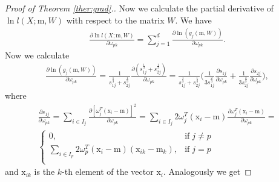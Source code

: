 \documentclass[12pt]{article}
\def\w{\omega}
\def\v{\mathrm{V}}
\def\x{\mathrm{x}}
\def\m{\mathrm{m}}
\theoremstyle{definition}
\begin{document}
\begin{proof}[Proof of Theorem \ref{ther:grad}.]
Now we calculate the partial derivative of $\ln {l}(X;\m,W)$ with respect to the matrix $W$. We have
$$
\begin{array}{l}
\frac{\partial \ln {l}(X;\m,W)}{\partial \w_{pk}} = \sum\limits_{j=1}^d \frac{\partial \ln ({g}_j(\m,W))}{\partial \w_{pk}}.
\end{array}
$$
Now we calculate %
$$
\begin{array}{l}
\frac{\partial \ln ({g}_j(\m,W))}{\partial \w_{pk}} = \frac{1}{{s}_{1j}^{\frac{1}{3}} + {s}_{2j}^{\frac{1}{3}}} \frac{\partial ({s}_{1j}^{\frac{1}{3}} + {s}_{2j}^{\frac{1}{3}})}{\partial \w_{pk}}= \frac{1}{{s}_{1j}^{\frac{1}{3}} + {s}_{2j}^{\frac{1}{3}}} \bigg(
\frac{1}{3 {s}_{1j}^{\frac{2}{3}}}  \frac{\partial {s}_{1j}}{\partial \w_{pk}} +
\frac{1}{3 {s}_{2j}^{\frac{2}{3}}}  \frac{\partial {s}_{2j}}{\partial \w_{pk}}
\bigg),
\end{array}
$$
where
$$
\begin{array}{l}
\frac{\partial {s}_{1j}}{\partial \w_{pk}} = \sum\limits_{ i \in {I}_j} \frac{\partial [\w^T_j (\x_i - \m)]^2}{\partial \w_{pk}} = \sum\limits_{ i \in {I}_j} 2 \w^T_j (\x_i - \m) \frac{\partial \w^T_j (\x_i - \m)}{\partial \w_{pk}}=
\\[6pt]
\left\{ \begin{array}{ll}
0, & \text{if} \; j\neq p\\
\sum\limits_{ i \in {I}_p} 2 \w^T_p (\x_i - \m) (\x_{ik} - \m_k), & \text{if} \; j=p\\
\end{array} \right.
\end{array}
$$
and $\x_{ik}$ is the $k$-th element of the vector $\x_i$. Analogously we get

\end{proof}
\end{document}
